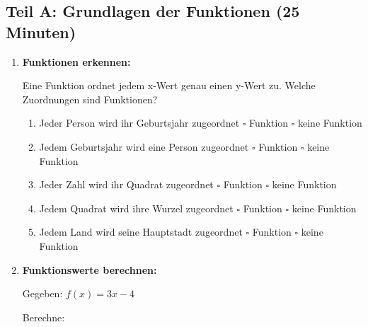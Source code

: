 \subsection*{Teil A: Grundlagen der Funktionen (25 Minuten)}

\begin{enumerate}[label=\arabic*.]

    \item \textbf{Funktionen erkennen:}

    Eine Funktion ordnet jedem x-Wert genau einen y-Wert zu. Welche Zuordnungen sind Funktionen?

    \vspace{0.5cm}
    \begin{enumerate}[label=\alph*)]
        \item Jeder Person wird ihr Geburtsjahr zugeordnet \hspace{2cm} $\square$ Funktion \hspace{1cm} $\square$ keine Funktion

        \item Jedem Geburtsjahr wird eine Person zugeordnet \hspace{2cm} $\square$ Funktion \hspace{1cm} $\square$ keine Funktion

        \item Jeder Zahl wird ihr Quadrat zugeordnet \hspace{2cm} $\square$ Funktion \hspace{1cm} $\square$ keine Funktion

        \item Jedem Quadrat wird ihre Wurzel zugeordnet \hspace{2cm} $\square$ Funktion \hspace{1cm} $\square$ keine Funktion

        \item Jedem Land wird seine Hauptstadt zugeordnet \hspace{2cm} $\square$ Funktion \hspace{1cm} $\square$ keine Funktion
    \end{enumerate}

    \vspace{1cm}

    \item \textbf{Funktionswerte berechnen:}

    Gegeben: $f(x) = 3x - 4$

    Berechne: \vspace{0.5cm}


\end{enumerate}

